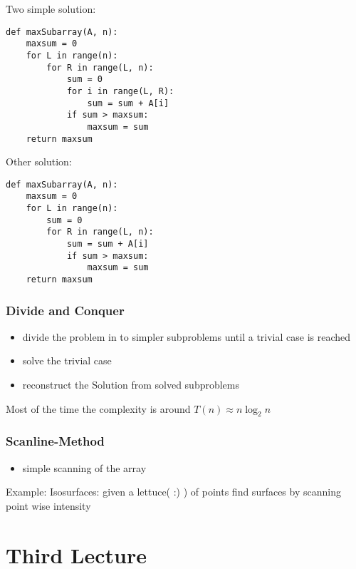 \documentclass[a4paper]{article}
\begin{document}
Two simple solution:
\begin{lstlisting}
def maxSubarray(A, n):
    maxsum = 0
    for L in range(n):
        for R in range(L, n):
            sum = 0
            for i in range(L, R):
                sum = sum + A[i]
            if sum > maxsum:
                maxsum = sum
    return maxsum
\end{lstlisting}

Other solution:

\begin{lstlisting}
def maxSubarray(A, n):
    maxsum = 0
    for L in range(n):
        sum = 0
        for R in range(L, n):
            sum = sum + A[i]
            if sum > maxsum:
                maxsum = sum
    return maxsum
\end{lstlisting}

\subsubsection{Divide and Conquer}
\begin{itemize}
    \item divide the problem in to simpler subproblems until a trivial case is reached
    \item solve the trivial case
    \item reconstruct the Solution from solved subproblems
\end{itemize}
Most of the time the complexity is around $ T(n) \approx n \log_2 n $

\subsubsection{Scanline-Method}

\begin{itemize}
    \item simple scanning of the array
\end{itemize}

Example:
Isosurfaces: given a lettuce( :) ) of points find surfaces by scanning point wise intensity

\newpage

\section{Third Lecture}
\end{document}
